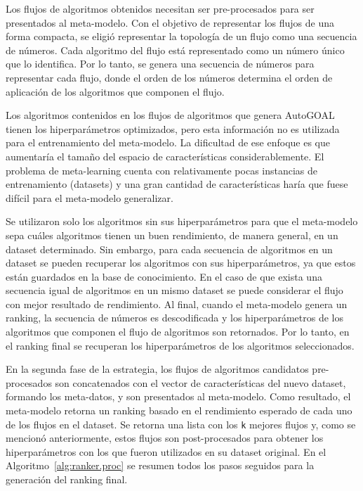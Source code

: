 Los flujos de algoritmos obtenidos necesitan ser pre-procesados para ser presentados al meta-modelo. Con el objetivo de representar los flujos de una forma compacta, se eligió representar la topología de un flujo como una secuencia de números. Cada algoritmo del flujo está representado como un número único que lo identifica. Por lo tanto, se genera una secuencia de números para representar cada flujo, donde el orden de los números determina el orden de aplicación de los algoritmos que componen el flujo.

Los algoritmos contenidos en los flujos de algoritmos que genera AutoGOAL tienen los hiperparámetros optimizados, pero esta información no es utilizada para el entrenamiento del meta-modelo. La dificultad de ese enfoque es que aumentaría el tamaño del espacio de características considerablemente. El problema de meta-learning cuenta con relativamente pocas instancias de entrenamiento (datasets) y una gran cantidad de características haría que fuese difícil para el meta-modelo generalizar.

Se utilizaron solo los algoritmos sin sus hiperparámetros para que el meta-modelo sepa cuáles algoritmos tienen un buen rendimiento, de manera general, en un dataset determinado. Sin embargo, para cada secuencia de algoritmos en un dataset se pueden recuperar los algoritmos con sus hiperparámetros, ya que estos están guardados en la base de conocimiento. En el caso de que exista una secuencia igual de algoritmos en un mismo dataset se puede considerar el flujo con mejor resultado de rendimiento. Al final, cuando el meta-modelo genera un ranking, la secuencia de números es descodificada y los hiperparámetros de los algoritmos que componen el flujo de algoritmos son retornados. Por lo tanto, en el ranking final se recuperan los hiperparámetros de los algoritmos seleccionados.

En la segunda fase de la estrategia, los flujos de algoritmos candidatos pre-procesados son concatenados con el vector de características del nuevo dataset, formando los meta-datos, y son presentados al meta-modelo. Como resultado, el meta-modelo retorna un ranking basado en el rendimiento esperado de cada uno de los flujos en el dataset. Se retorna una lista con los \texttt{k} mejores flujos y, como se mencionó anteriormente, estos flujos son post-procesados para obtener los hiperparámetros con los que fueron utilizados en su dataset original. En el Algoritmo~\ref{alg:ranker.proc} se resumen todos los pasos seguidos para la generación del ranking final.
 
